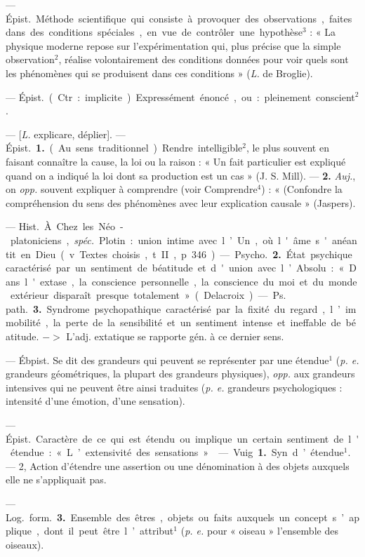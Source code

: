 \begin{itemize}[leftmargin=1cm, label=, itemsep=1pt]
 — \si{Épist.} Méthode
scientifique qui consiste à provoquer
des observations, faites dans des conditions spéciales, en vue de contrôler
une hypothèse$^3$ : « La physique
moderne repose sur l'expérimentation qui, plus précise que la
simple observation$^2$, réalise volontairement des conditions données
pour voir quels sont les phénomènes
qui se produisent dans ces conditions » ({\it L.} de Broglie).

 — \si{Épist.} (Ctr. : implicite).
Expressément énoncé, ou : pleinement conscient$^2$.

 — [{\it L.} explicare, déplier]. —
\si{Épist.} {\bf 1.} (Au sens traditionnel).
Rendre intelligible$^2$, le plus souvent
en faisant connaître la cause, la loi
ou la raison : « Un fait particulier est
expliqué quand on a indiqué la loi
dont sa production est un cas »
(J. S. Mill). — {\bf 2.} {\it Auj.}, on {\it opp.} souvent expliquer à comprendre (voir
Comprendre$^4$) : « (Confondre la
compréhension du sens des phénomènes avec leur explication causale »
(Jaspers).

 — \si{Hist.} À. Chez les Néo-platoniciens, {\it spéc.} Plotin : union intime
avec l’Un, où l'âme s'anéantit en
Dieu (v. Textes choisis, t. II, p. 346).
— \si{Psycho.} {\bf 2.} État psychique caractérisé par un sentiment de béatitude
et d'union avec l’Absolu : « Dans
l'extase, la conscience personnelle,
la conscience du moi et du monde
extérieur disparaît presque totalement » (Delacroix). — \si{Ps. path.}
 {\bf 3.} Syndrome psychopathique caractérisé par la fixité du regard, l’immobilité, la perte de la sensibilité
et un sentiment intense et ineffable
de béatitude. $->$ L'adj. extatique
se rapporte gén. à ce dernier sens.

 — Ébpist. Se dit des grandeurs qui peuvent se représenter par
une étendue$^1$ ({\it p. e.} grandeurs géométriques, la plupart des grandeurs
physiques), {\it opp.} aux grandeurs
intensives qui ne peuvent être ainsi
traduites ({\it p. e.} grandeurs psychologiques : intensité d'une émotion,
d’une sensation).

 — \si{Épist.} Caractère de ce
qui est étendu ou implique un certain
sentiment de l'étendue : « L’extensivité des sensations ».

 — Vuig. {\bf 1.} Syn. d’étendue$^1$.
— 2, Action d'étendre une assertion ou une dénomination à des
objets auxquels elle ne s’appliquait
pas.

— \si{Log.} \si{form.} {\bf 3.} Ensemble des
êtres, objets ou faits auxquels un
concept s’applique, dont il peut être
l’attribut$^1$ ({\it p. e.} pour « oiseau »
l’ensemble des oiseaux).


\end{itemize}
